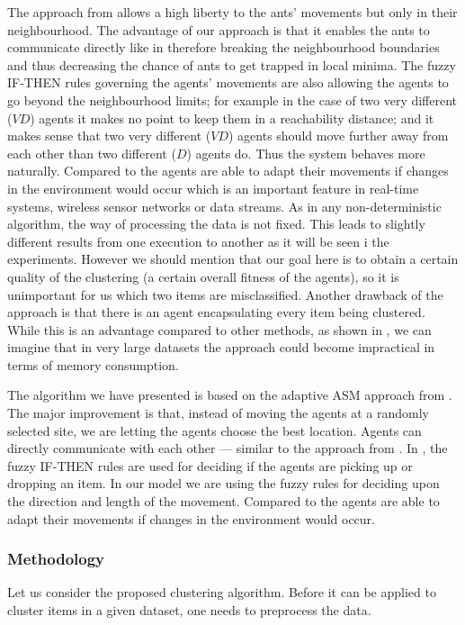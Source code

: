The approach from \cite{Chen04AnAdaptive} allows a high liberty to the ants' movements but only in their neighbourhood. The advantage of our approach is that it enables the  ants to communicate directly like in \cite{Chira07Stigmergic} therefore breaking the neighbourhood boundaries and thus decreasing the chance of ants to get trapped in local minima. The fuzzy IF-THEN rules governing the agents' movements are also allowing the agents to go beyond the neighbourhood limits; for example in the case of two very different ($VD$) agents it makes no point to keep them in a reachability distance; and it makes sense that two very different ($VD$) agents should move further away from each other than two different ($D$) agents do. Thus the system behaves more naturally. Compared to \cite{Gaceanu10AnAdaptive} the agents are able to adapt their movements if changes in the environment would occur which is an important feature in real-time systems, wireless sensor networks or data streams. As in any non-deterministic algorithm, the way of processing the data is not fixed. This leads to slightly different results from one execution to another as it will be seen i the experiments. However we should mention that our goal here is to obtain a certain quality of the clustering (a certain overall fitness of the agents), so it is unimportant for us which two items are misclassified. Another drawback of the approach is that there is an agent encapsulating every item being clustered. While this is an advantage compared to other methods, as shown in \cite{Chen04AnAdaptive}, we can imagine that in very large datasets the approach could become impractical in terms of memory consumption.

The algorithm we have presented is based on the adaptive ASM approach from \cite{Chen04AnAdaptive}. The major improvement is that, instead of moving the agents at a randomly selected site, we are letting the agents choose the best location. Agents can directly communicate with each other --- similar to the approach from \cite{Chira07Stigmergic}. In \cite{Schockaert04Fuzzy}, the fuzzy IF-THEN rules are used for deciding if the agents are picking up or dropping an item. In our model we are using the fuzzy rules for deciding upon the direction and length of the movement. Compared to \cite{Gaceanu10AnAdaptive} the agents are able to adapt their movements if changes in the environment would occur. 


\subsubsection{Methodology}
Let us consider the proposed clustering algorithm. Before it can be applied to cluster items in a given dataset, one needs to preprocess the data. 

